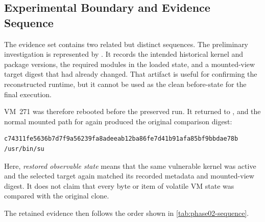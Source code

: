 \subsection{Experimental Boundary and Evidence Sequence}

The evidence set contains two related but distinct sequences. The preliminary
investigation is represented by
. It records the
intended historical kernel and package versions, the required modules in the
loaded state, and a mounted-view target digest that had already changed. That
artifact is useful for confirming the reconstructed runtime, but it cannot be
used as the clean before-state for the final execution.

VM~271 was therefore rebooted before the preserved run. It returned to
, and the normal mounted path for
 again produced the original comparison digest:

\begin{lstlisting}
c74311fe5636b7d7f9a56239fa8adeeab12ba86fe7d41b91afa85bf9bbdae78b  /usr/bin/su
\end{lstlisting}

Here, \emph{restored observable state} means that the same vulnerable kernel
was active and the selected target again matched its recorded metadata and
mounted-view digest. It does not claim that every byte or item of volatile VM
state was compared with the original clone.

The retained evidence then follows the order shown in
\cref{tab:phase02-sequence}.

